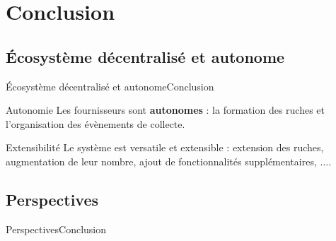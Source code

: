 \documentclass[usenames,dvipsnames]{beamer}
\begin{document}
\section{Conclusion}
\subsection{Écosystème décentralisé et autonome}
\begin{frame}{Écosystème décentralisé et autonome}{Conclusion}

\begin{block}{Autonomie}
Les fournisseurs sont \textbf{autonomes} : la formation des ruches et l'organisation des évènements de collecte.
\end{block}

\begin{block}{Extensibilité}
Le système est versatile et extensible : extension des ruches, augmentation de leur nombre, ajout de fonctionnalités supplémentaires, $\dots$.
\end{block}

\end{frame}

\subsection{Perspectives}
\begin{frame}{Perspectives}{Conclusion}
\end{frame}
\end{document}

